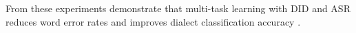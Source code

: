  
From these experiments demonstrate that multi-task learning with DID and ASR reduces word error rates and improves dialect classification accuracy \parencite{takahashi2024comparison}. 






